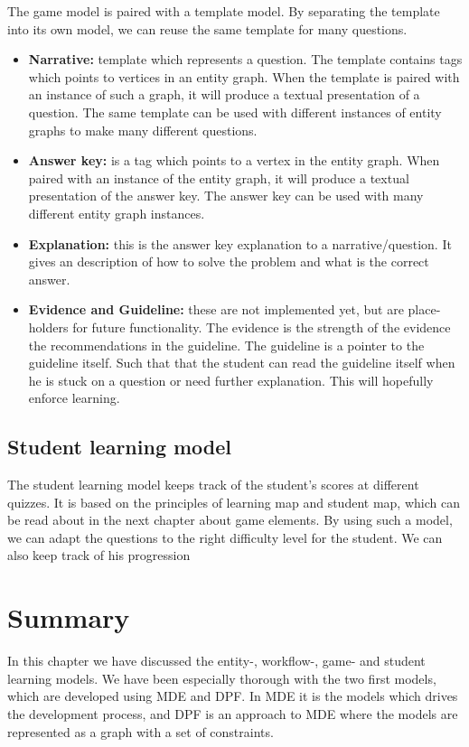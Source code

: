 The game model is paired with a template model. By separating the template into its own model, we can reuse the same template for many questions.
\begin{itemize}
	\item \textbf{Narrative:} template which represents a question. The template contains tags which points to vertices in an entity graph. When the template is paired with an instance of such a graph, it will produce a textual presentation of a question. The same template can be used with different instances of entity graphs to make many different questions.
	\item \textbf{Answer key:} is a tag which points to a vertex in the entity graph. When paired with an instance of the entity graph, it will produce a textual presentation of the answer key. The answer key can be used with many different entity graph instances.
	\item \textbf{Explanation:} this is the answer key explanation to a narrative/question. It gives an description of how to solve the problem and what is the correct answer.
	\item \textbf{Evidence and Guideline:} these are not implemented yet, but are place-holders for future functionality. The evidence is the strength of the evidence the recommendations in the guideline. The guideline is a pointer to the guideline itself. Such that that the student can read the guideline itself when he is stuck on a question or need further explanation. This will hopefully enforce learning.
\end{itemize}

\subsection{Student learning model}
The student learning model keeps track of the student's scores at different quizzes. It is based on the principles of learning map and student map, which can be read about in the next chapter about game elements. By using such a model, we can adapt the questions to the right difficulty level for the student. We can also keep track of his progression

\section{Summary}
In this chapter we have discussed the entity-, workflow-, game- and student learning models. We have been especially thorough with the two first models, which are developed using MDE and DPF. In MDE it is the models which drives the development process, and DPF is an approach to MDE where the models are represented as a graph with a set of constraints.

